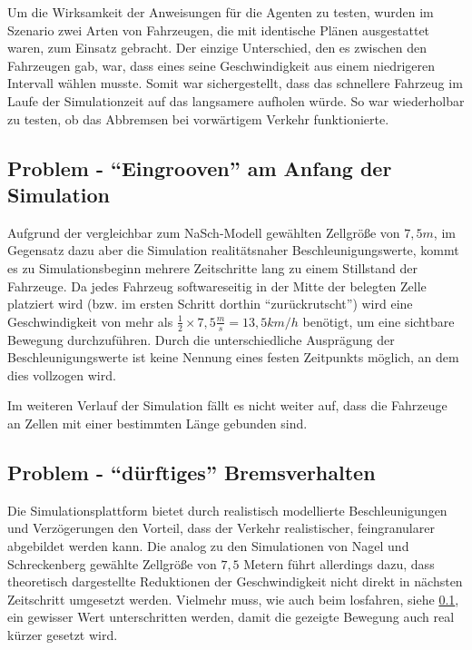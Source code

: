 Um die Wirksamkeit der Anweisungen für die Agenten zu testen, wurden im Szenario zwei Arten von Fahrzeugen, die mit identische Plänen ausgestattet waren, zum Einsatz gebracht.
Der einzige Unterschied, den es zwischen den Fahrzeugen gab, war, dass eines seine Geschwindigkeit aus einem niedrigeren Intervall wählen musste.
Somit war sichergestellt, dass das schnellere Fahrzeug im Laufe der Simulationzeit auf das langsamere aufholen würde.
So war wiederholbar zu testen, ob das Abbremsen bei vorwärtigem Verkehr funktionierte.



\subsection{Problem - \enquote{Eingrooven} am Anfang der Simulation}
\label{sec:accelerategroove}

Aufgrund der vergleichbar zum NaSch-Modell gewählten Zellgröße von $7,5 m$, im Gegensatz dazu aber die Simulation realitätsnaher Beschleunigungswerte, kommt es zu Simulationsbeginn mehrere Zeitschritte lang zu einem Stillstand der Fahrzeuge.
Da jedes Fahrzeug softwareseitig in der Mitte der belegten Zelle platziert wird (bzw. im ersten Schritt dorthin \enquote{zurückrutscht}) wird eine Geschwindigkeit von mehr als $ \frac{1}{2} \times 7,5 \frac{m}{s} = 13,5 km/h$ benötigt, um eine sichtbare Bewegung durchzuführen.
Durch die unterschiedliche Ausprägung der Beschleunigungswerte ist keine Nennung eines festen Zeitpunkts möglich, an dem dies vollzogen wird.

Im weiteren Verlauf der Simulation fällt es nicht weiter auf, dass die Fahrzeuge an Zellen mit einer bestimmten Länge gebunden sind.



\subsection{Problem - \enquote{dürftiges} Bremsverhalten}

Die Simulationsplattform bietet durch realistisch modellierte Beschleunigungen und Verzögerungen den Vorteil, dass der Verkehr realistischer, feingranularer abgebildet werden kann.
Die analog zu den Simulationen von Nagel und Schreckenberg gewählte Zellgröße von $7,5$ Metern führt allerdings dazu, dass theoretisch dargestellte Reduktionen der Geschwindigkeit nicht direkt in nächsten Zeitschritt umgesetzt werden.
Vielmehr muss, wie auch beim losfahren, siehe \cref{sec:accelerategroove}, ein gewisser Wert unterschritten werden, damit die gezeigte Bewegung auch real kürzer gesetzt wird.

